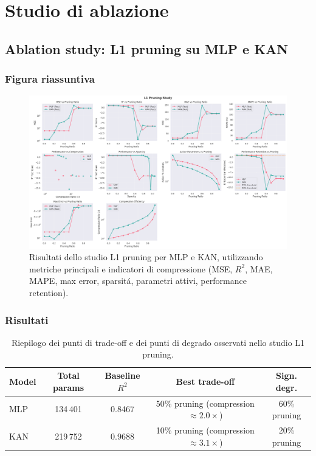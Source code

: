 \documentclass[a4paper,12pt]{report}
\begin{document}
	\section{Studio di ablazione}
	
	\subsection{Ablation study: L1 pruning su MLP e KAN}
	
	\subsubsection{Figura riassuntiva}
	\begin{figure}[H]
		\centering
		\includegraphics[width=1.0\textwidth]{img/abl_kanvsmlp_car.png}
		\caption{Risultati dello studio L1 pruning per MLP e KAN, utilizzando metriche principali e indicatori di compressione (MSE, \(R^2\), MAE, MAPE, max error, sparsitá, parametri attivi, performance retention).}
	\end{figure}
	
	\subsubsection{Risultati}
	\begin{table}[H]
		\centering
		\setlength{\tabcolsep}{4pt}
		\begin{tabular}{lcccc}
			\toprule
			\textbf{Model} & \textbf{Total params} & \textbf{Baseline $R^2$} & \textbf{Best trade-off} & \textbf{Sign. degr.} \\
			\midrule
			MLP & 134\,401  & 0.8467 & 50\% pruning (compression $\approx 2.0\times$) & 60\% pruning \\
			KAN & 219\,752  & 0.9688 & 10\% pruning (compression $\approx 3.1\times$) & 20\% pruning \\
			\bottomrule
		\end{tabular}
		\caption{Riepilogo dei punti di trade-off e dei punti di degrado osservati nello studio L1 pruning.}
	\end{table}
	
\end{document}
